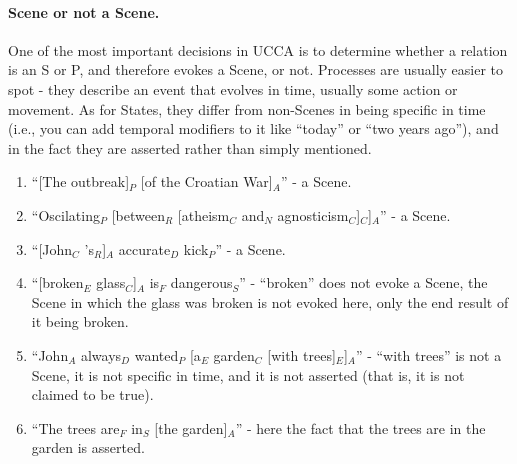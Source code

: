 \documentclass[11pt]{article}
\newcommand{\be}{\begin{enumerate}}
\newcommand{\ee}{\end{enumerate}}
\begin{document}
\paragraph{Scene or not a Scene.} One of the most important decisions in UCCA is to determine whether a relation is an S or P, and therefore evokes a Scene, or not. Processes are usually easier to spot - they describe an event that evolves in time, usually some action or movement. As for States, they differ from non-Scenes in being specific in time (i.e., you can add temporal modifiers to it like ``today'' or ``two years ago''), and in the fact they are asserted rather than simply mentioned.
\be
\item
``[The outbreak]$_P$ [of the Croatian War]$_A$'' - a Scene.
\item
``Oscilating$_P$ [between$_R$ [atheism$_C$ and$_N$ agnosticism$_C$]$_C$]$_A$'' - a Scene.
\item
``[John$_C$ 's$_R$]$_A$ accurate$_D$ kick$_P$'' - a Scene.
\item
``[broken$_E$ glass$_C$]$_A$ is$_F$ dangerous$_S$'' - ``broken'' does not evoke a Scene, the Scene in which the glass was broken is not evoked here, only the end result of it being broken.
\item
``John$_A$ always$_D$ wanted$_P$ [a$_E$ garden$_C$ [with trees]$_E$]$_A$'' - ``with trees'' is not a Scene, it is not specific in time, and it is not asserted (that is, it is not claimed to be true).
\item
``The trees are$_F$ in$_S$ [the garden]$_A$'' - here the fact that the trees are in the garden is asserted.
\ee
\end{document}
